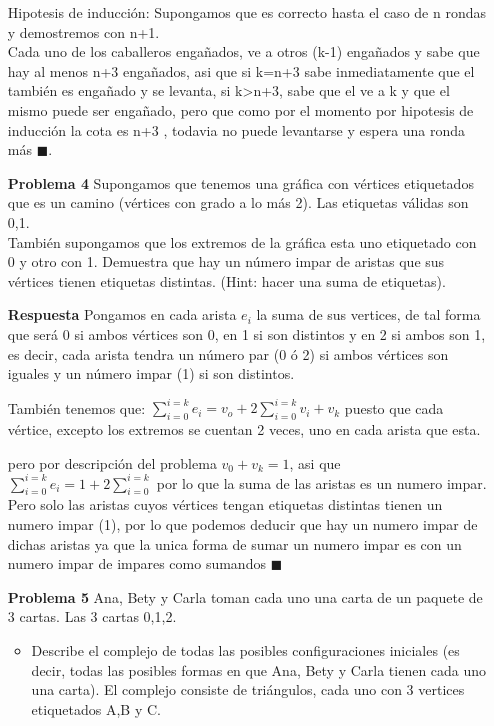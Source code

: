 \documentclass{article}
\begin{document}
\begin{enumerate}
Hipotesis de inducción: Supongamos que es correcto hasta el caso de n rondas y demostremos con n+1.\\
Cada uno de los caballeros engañados, ve a otros (k-1) engañados y sabe que hay al menos n+3 engañados, asi que si k=n+3 sabe inmediatamente que el también es engañado y se levanta, si k>n+3, sabe que el ve a k y que el mismo puede ser engañado, pero que como por el momento por hipotesis de inducción la cota es n+3 , todavia no puede levantarse y espera una ronda más $\blacksquare$.\\




\item[\bf{Problema 4}] Supongamos que tenemos una gráfica con vértices etiquetados que es un camino (vértices con grado a lo más 2). Las etiquetas válidas son 0,1.\\
También supongamos que los extremos de la gráfica esta uno etiquetado con 0 y otro con 1. Demuestra que hay un número impar de aristas que sus vértices tienen etiquetas distintas. (Hint: hacer una suma de etiquetas).

\item[\bf{Respuesta}] 
Pongamos en cada arista $e_i$ la suma de sus vertices, de tal forma que será 0 si ambos vértices son 0, en 1 si son distintos y en 2 si ambos son 1, es decir, cada arista tendra un número par (0 ó 2) si ambos vértices son iguales y un número impar (1) si son distintos.

También tenemos que: $\sum_{i=0}^{i=k} e_i =v_o+2 \sum_{i=0}^{i=k} v_i + v_k $ puesto que cada vértice, excepto los extremos se cuentan 2 veces, uno en cada arista que esta.

pero por descripción del problema $v_0+v_k=1$, asi que $\sum_{i=0}^{i=k} e_i =1+2 \sum_{i=0}^{i=k} $ por lo que la suma de las aristas es un numero impar.\\

Pero solo las aristas cuyos vértices tengan etiquetas distintas tienen un numero impar (1), por lo que podemos deducir que hay un numero impar de dichas aristas ya que la unica forma de sumar un numero impar es con un numero impar de impares como sumandos $\blacksquare$



\item[\bf{Problema 5}] Ana, Bety y Carla toman cada uno una carta de un paquete de 3 cartas. Las 3 cartas 0,1,2.

\begin{itemize}
\item Describe el complejo de todas las posibles configuraciones iniciales
(es decir, todas las posibles formas en que Ana, Bety y Carla tienen
cada uno una carta). El complejo consiste de triángulos, cada uno
con 3 vertices etiquetados A,B y C.


\end{itemize}
\end{enumerate}
\end{document}
